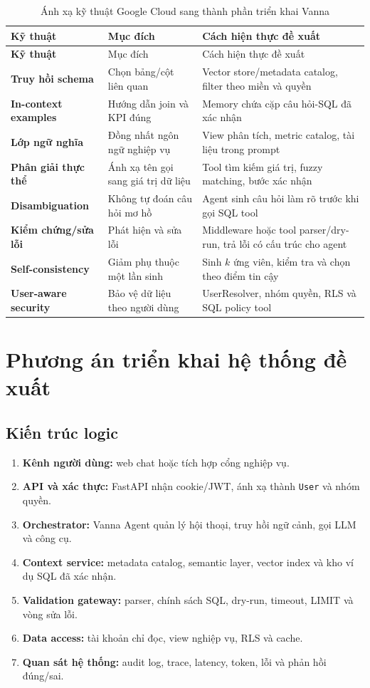 \documentclass[12pt,a4paper]{article}
\begin{document}
\begin{longtable}{>{\bfseries}p{3.2cm}p{5.0cm}p{6.0cm}}
\caption{Ánh xạ kỹ thuật Google Cloud sang thành phần triển khai Vanna}\\
\toprule
Kỹ thuật & Mục đích & Cách hiện thực đề xuất\\
\midrule
\endfirsthead
\toprule
Kỹ thuật & Mục đích & Cách hiện thực đề xuất\\
\midrule
\endhead
Truy hồi schema & Chọn bảng/cột liên quan &
Vector store/metadata catalog, filter theo miền và quyền\\
In-context examples & Hướng dẫn join và KPI đúng &
Memory chứa cặp câu hỏi-SQL đã xác nhận\\
Lớp ngữ nghĩa & Đồng nhất ngôn ngữ nghiệp vụ &
View phân tích, metric catalog, tài liệu trong prompt\\
Phân giải thực thể & Ánh xạ tên gọi sang giá trị dữ liệu &
Tool tìm kiếm giá trị, fuzzy matching, bước xác nhận\\
Disambiguation & Không tự đoán câu hỏi mơ hồ &
Agent sinh câu hỏi làm rõ trước khi gọi SQL tool\\
Kiểm chứng/sửa lỗi & Phát hiện và sửa lỗi &
Middleware hoặc tool parser/dry-run, trả lỗi có cấu trúc cho agent\\
Self-consistency & Giảm phụ thuộc một lần sinh &
Sinh $k$ ứng viên, kiểm tra và chọn theo điểm tin cậy\\
User-aware security & Bảo vệ dữ liệu theo người dùng &
UserResolver, nhóm quyền, RLS và SQL policy tool\\
\bottomrule
\end{longtable}

\section{Phương án triển khai hệ thống đề xuất}

\subsection{Kiến trúc logic}

\begin{enumerate}
  \item \textbf{Kênh người dùng:} web chat hoặc tích hợp cổng nghiệp vụ.
  \item \textbf{API và xác thực:} FastAPI nhận cookie/JWT, ánh xạ thành
  \texttt{User} và nhóm quyền.
  \item \textbf{Orchestrator:} Vanna Agent quản lý hội thoại, truy hồi ngữ
  cảnh, gọi LLM và công cụ.
  \item \textbf{Context service:} metadata catalog, semantic layer, vector
  index và kho ví dụ SQL đã xác nhận.
  \item \textbf{Validation gateway:} parser, chính sách SQL, dry-run, timeout,
  LIMIT và vòng sửa lỗi.
  \item \textbf{Data access:} tài khoản chỉ đọc, view nghiệp vụ, RLS và cache.
  \item \textbf{Quan sát hệ thống:} audit log, trace, latency, token, lỗi và
  phản hồi đúng/sai.
\end{enumerate}
\end{document}
